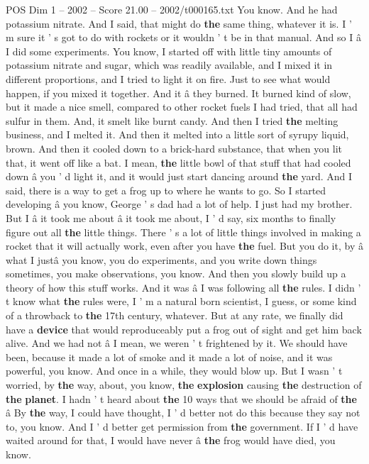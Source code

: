 \begin{textsample}{POS Dim 1 – 2002 – Score 21.00 – 2002/t000165.txt}
You know.
And he had potassium nitrate.
And I said, that might do \textbf{the} same thing, whatever it is.
I ' m sure it ' s got to do with rockets or it wouldn ' t be in that manual.
And so I â I did some experiments.
You know, I started off with little tiny amounts of potassium nitrate and sugar, which was readily available, and I mixed it in different proportions, and I tried to light it on fire.
Just to see what would happen, if you mixed it together.
And it â they burned.
It burned kind of slow, but it made a nice smell, compared to other rocket fuels I had tried, that all had sulfur in them.
And, it smelt like burnt candy.
And then I tried \textbf{the} melting business, and I melted it.
And then it melted into a little sort of syrupy liquid, brown.
And then it cooled down to a brick-hard substance, that when you lit that, it went off like a bat.
I mean, \textbf{the} little bowl of that stuff that had cooled down â you ' d light it, and it would just start dancing around \textbf{the} yard.
And I said, there is a way to get a frog up to where he wants to go.
So I started developing â you know, George ' s dad had a lot of help.
I just had my brother.
But I â it took me about â it took me about, I ' d say, six months to finally figure out all \textbf{the} little things.
There ' s a lot of little things involved in making a rocket that it will actually work, even after you have \textbf{the} fuel.
But you do it, by â what I justâ you know, you do experiments, and you write down things sometimes, you make observations, you know.
And then you slowly build up a theory of how this stuff works.
And it was â I was following all \textbf{the} rules.
I didn ' t know what \textbf{the} rules were, I ' m a natural born scientist, I guess, or some kind of a throwback to \textbf{the} 17th century, whatever.
But at any rate, we finally did have a \textbf{device} that would reproduceably put a frog out of sight and get him back alive.
And we had not â I mean, we weren ' t frightened by it.
We should have been, because it made a lot of smoke and it made a lot of noise, and it was powerful, you know.
And once in a while, they would blow up.
But I wasn ' t worried, by \textbf{the} way, about, you know, \textbf{the} \textbf{explosion} causing \textbf{the} destruction of \textbf{the} \textbf{planet}.
I hadn ' t heard about \textbf{the} 10 ways that we should be afraid of \textbf{the} â By \textbf{the} way, I could have thought, I ' d better not do this because they say not to, you know.
And I ' d better get permission from \textbf{the} government.
If I ' d have waited around for that, I would have never â \textbf{the} frog would have died, you know.

\end{textsample}
